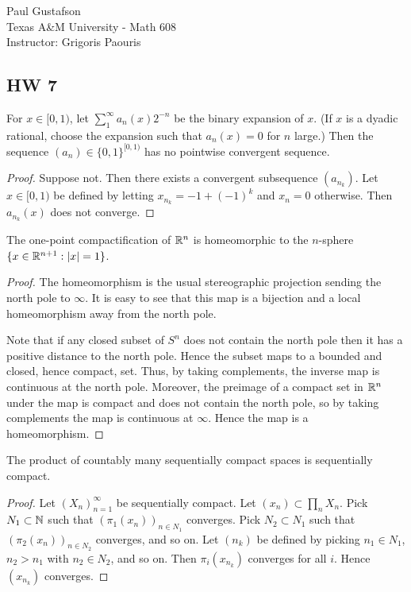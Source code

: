 \documentclass{article}
\begin{document}
\noindent Paul Gustafson\\
\noindent Texas A\&M University - Math 608 \\ 
\noindent Instructor: Grigoris Paouris

\subsection*{HW 7}

 For $x \in [0,1)$, let $\sum_1^\infty a_n(x) 2^{-n}$ be the binary expansion of $x$. 
(If $x$ is a dyadic rational, choose the expansion such that $a_n(x) = 0$ for $n$ large.) 
Then the sequence $(a_n) \in \{0, 1\}^{[0,1)}$ has no pointwise convergent sequence.
\begin{proof}
Suppose not. Then there exists a convergent subsequence $(a_{n_k})$. Let $x \in [0,1)$ be defined by letting $x_{n_k} = -1 + (-1)^k$ and $x_n = 0$ otherwise.  Then $a_{n_k}(x)$ does not converge.  
\end{proof}


 The one-point compactification of $\mathbb{R}^n$ is homeomorphic to the $n$-sphere 
$\{ x \in \mathbb{R}^{n+1} : |x| = 1\}$.
\begin{proof}
The homeomorphism is the usual stereographic projection sending the north pole to $\infty$.  It is easy to see that this map is a bijection and a local homeomorphism away from the north pole. 

Note that if any closed subset of $S^n$ does not contain the north pole then it has a positive distance to the north pole.  Hence the subset maps to a bounded and closed, hence compact, set. Thus, by taking complements, the inverse map is continuous at the north pole. Moreover, the preimage of a compact set in $\mathbb{R}^n$ under the map is compact and does not contain the north pole, so by taking complements the map is continuous at $\infty$.  Hence the map is a homeomorphism.
\end{proof}

 The product of countably many sequentially compact spaces is sequentially compact.
\begin{proof}
Let $(X_n)_{n=1}^\infty$ be sequentially compact.  Let $(x_n) \subset \prod_n X_n$.  Pick $N_1 \subset \mathbb{N}$ such that $(\pi_1(x_n))_{n \in N_1}$ converges. Pick $N_2 \subset N_1$ such that $(\pi_2(x_n))_{n \in N_2}$ converges, and so on.
Let $(n_k)$ be defined by picking $n_1 \in N_1$, $n_2 > n_1$ with $n_2 \in N_2$, and so on.  Then $\pi_i(x_{n_k})$ converges for all $i$.  Hence $(x_{n_k})$ converges.
\end{proof}
\end{document}

